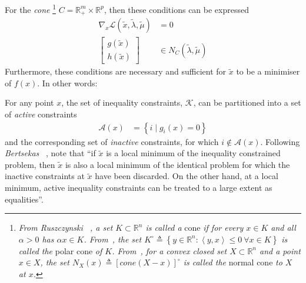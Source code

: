 \documentclass[a4paper,twoside,10pt,english]{report}
\begin{document}
For the \emph{cone}
\footnote{\emph{From \emph{Ruszczynski} 
~\cite[p.26]{Ruszczynski_NonlinearOptimization}, a set
$K\subset\mathbb{R}^{n}$ is called a }cone\emph{ if for every $x\in K$
and all $\alpha>0$ has $\alpha x\in K$. From~\cite[p.28]{Ruszczynski_NonlinearOptimization},
the set $K^{\circ}\triangleq\left\{ y\in\mathbb{R}^{n}:\left\langle y,x\right\rangle \le 0 ~ \forall x\in K\right\} $
is called the }polar cone\emph{ of $K$. From~\cite[p.37]{Ruszczynski_NonlinearOptimization},
for a convex closed set $X\subset\mathbb{R}^{n}$ and a point $x\in X$,
the set $N_{X}\left(x\right)\triangleq\left[cone\left(X-x\right)\right]^{\circ}$
is called the }normal cone\emph{ to $X$ at $x$.}
} $C=\mathbb{R}_{+}^{m}\times\mathbb{R}^{p}$, then these conditions
can be expressed
\begin{align*}
\nabla_{x}\mathcal{L}\left(\tilde{x},\tilde{\lambda},\tilde{\mu}\right) &= 0\\
\left[\begin{array}{c}
g\left(\tilde{x}\right)\\
h\left(\tilde{x}\right)
\end{array}\right] & \in N_{C}\left(\tilde{\lambda},\tilde{\mu}\right)
\end{align*}
Furthermore, these conditions are necessary and sufficient for $\tilde{x}$
to be a minimiser of $f\left(x\right)$. In other words:


For any point $x$, the set of inequality constraints, $\mathcal{K}$,
can be partitioned into a set of \emph{active} constraints
\begin{align*}
\mathcal{A}\left(x\right) &= \left\{ i\mid g_{i}\left(x\right)=0\right\} 
\end{align*}
and the corresponding set of \emph{inactive} constraints, for which
$i\notin\mathcal{A}\left(x\right)$. Following \emph{Bertsekas} 
~\cite[Section 3.3]{Bertsekas_NonlinearProgramming},
note that ``if $\tilde{x}$ is a local minimum of the inequality
constrained problem, then $\tilde{x}$ is also a local minimum of
the identical problem for which the inactive constraints at $\tilde{x}$
have been discarded. On the other hand, at a local minimum, active
inequality constraints can be treated to a large extent as equalities''. 
\end{document}
